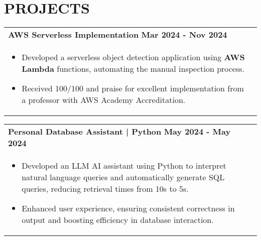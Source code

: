 \documentclass[a4paper,8pt]{article}
\begin{document}
\section{\textbf{PROJECTS}}
\begin{tabularx}{\linewidth}{ @{}l r@{} }
\textbf{AWS Serverless Implementation} \hfill \textbf{Mar 2024 - Nov 2024} \\[0.5pt]
\begin{minipage}[t]{\linewidth}
    \begin{itemize}[nosep,after=\strut, leftmargin=1em, itemsep=1pt]
        \item Developed a serverless object detection application using \textbf{AWS Lambda} functions, automating the manual inspection process.
        \item Received 100/100 and praise for excellent implementation from a professor with AWS Academy Accreditation.
    \end{itemize}
\end{minipage}
\end{tabularx}
\begin{tabularx}{\linewidth}{ @{}l r@{} }
\textbf{Personal Database Assistant | Python} \hfill \textbf{May 2024 - May 2024} \\[0.5pt]
\begin{minipage}[t]{\linewidth}
    \begin{itemize}[nosep,after=\strut, leftmargin=1em, itemsep=1pt]
        \item Developed an LLM AI assistant using Python to interpret natural language queries and automatically generate SQL queries, reducing retrieval times from 10s to 5s.
        \item Enhanced user experience, ensuring consistent correctness in output and boosting efficiency in database interaction.
    \end{itemize}
\end{minipage}
\end{tabularx}
\end{document}
